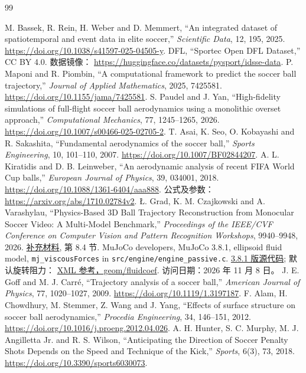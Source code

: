 \documentclass[12pt,letterpaper]{article}
\begin{document}
\begin{thebibliography}{99}
\raggedright
{} M. Bassek, R. Rein, H. Weber and D. Memmert, ``An integrated dataset of spatiotemporal and event data in elite soccer,'' \emph{Scientific Data}, 12, 195, 2025. \url{https://doi.org/10.1038/s41597-025-04505-y}.
 DFL, ``Sportec Open DFL Dataset,'' CC BY 4.0. 数据镜像： \url{https://huggingface.co/datasets/pysport/idsse-data}.
 P. Maponi and R. Piombin, ``A computational framework to predict the soccer ball trajectory,'' \emph{Journal of Applied Mathematics}, 2025, 7425581. \url{https://doi.org/10.1155/jama/7425581}.
 S. Paudel and J. Yan, ``High-fidelity simulations of full-flight soccer ball aerodynamics using a monolithic overset approach,'' \emph{Computational Mechanics}, 77, 1245--1265, 2026. \url{https://doi.org/10.1007/s00466-025-02705-2}.
 T. Asai, K. Seo, O. Kobayashi and R. Sakashita, ``Fundamental aerodynamics of the soccer ball,'' \emph{Sports Engineering}, 10, 101--110, 2007. \url{https://doi.org/10.1007/BF02844207}.
 A. L. Kiratidis and D. B. Leinweber, ``An aerodynamic analysis of recent FIFA World Cup balls,'' \emph{European Journal of Physics}, 39, 034001, 2018. \url{https://doi.org/10.1088/1361-6404/aaa888}. 公式及参数： \url{https://arxiv.org/abs/1710.02784v2}.
 \L{}. Grad, K. M. Czajkowski and A. Varashylau, ``Physics-Based 3D Ball Trajectory Reconstruction from Monocular Soccer Video: A Multi-Model Benchmark,'' \emph{Proceedings of the IEEE/CVF Conference on Computer Vision and Pattern Recognition Workshops}, 9940--9948, 2026. \href{https://openaccess.thecvf.com/content/CVPR2026W/CVsports/supplemental/Grad_Physics-Based_3D_Ball_CVPRW_2026_supplemental.pdf}{补充材料}, 第 8.4 节.
 MuJoCo developers, MuJoCo 3.8.1, ellipsoid fluid model, \texttt{mj\_viscousForces} in \texttt{src/engine/engine\_passive.c}. \href{https://github.com/google-deepmind/mujoco/blob/3.8.1/src/engine/engine_passive.c}{3.8.1 版源代码}; 默认旋转阻力： \href{https://mujoco.readthedocs.io/en/stable/XMLreference.html#body-geom-fluidcoef}{XML 参考，geom/fluidcoef}. 访问日期：2026 年 11 月 8 日。
 J. E. Goff and M. J. Carr\'e, ``Trajectory analysis of a soccer ball,'' \emph{American Journal of Physics}, 77, 1020--1027, 2009. \url{https://doi.org/10.1119/1.3197187}.
 F. Alam, H. Chowdhury, M. Stemmer, Z. Wang and J. Yang, ``Effects of surface structure on soccer ball aerodynamics,'' \emph{Procedia Engineering}, 34, 146--151, 2012. \url{https://doi.org/10.1016/j.proeng.2012.04.026}.
 A. H. Hunter, S. C. Murphy, M. J. Angilletta Jr. and R. S. Wilson, ``Anticipating the Direction of Soccer Penalty Shots Depends on the Speed and Technique of the Kick,'' \emph{Sports}, 6(3), 73, 2018. \url{https://doi.org/10.3390/sports6030073}.
\end{thebibliography}
\end{document}
